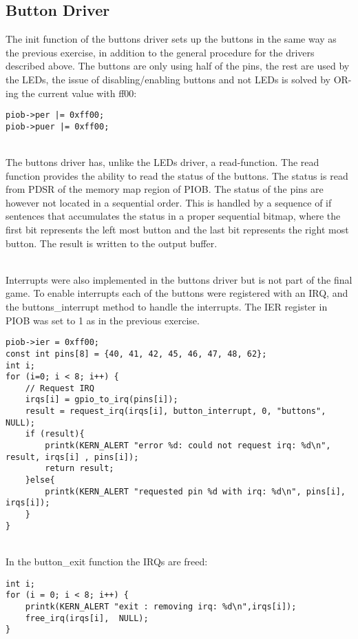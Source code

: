 \subsection{Button Driver}
The init function of the buttons driver sets up the buttons in the same way as the previous exercise, in addition to the general procedure for the drivers described above. The buttons are only using half of the pins, the rest are used by the LEDs, the issue of disabling/enabling buttons and not LEDs is solved by OR-ing the current value with ff00:
\begin{lstlisting}
piob->per |= 0xff00;
piob->puer |= 0xff00;
\end{lstlisting}

\\The buttons driver has, unlike the LEDs driver, a read-function. The read function provides the ability to read the status of the buttons. The status is read from PDSR of the memory map region of PIOB. The status of the pins are however not located in a sequential order. This is handled by a sequence of if sentences that accumulates the status in a proper sequential bitmap, where the first bit represents the left most button and the last bit represents the right most button. The result is written to the output buffer.

\\Interrupts were also implemented in the buttons driver but is not part of the final game. To enable interrupts each of the buttons were registered with an IRQ, and the buttons_interrupt method to handle the interrupts. The IER register in PIOB was set to 1 as in the previous exercise.
\begin{lstlisting}
piob->ier = 0xff00;
const int pins[8] = {40, 41, 42, 45, 46, 47, 48, 62};
int i;
for (i=0; i < 8; i++) {
	// Request IRQ
	irqs[i] = gpio_to_irq(pins[i]);
	result = request_irq(irqs[i], button_interrupt, 0, "buttons", NULL);
	if (result){
		printk(KERN_ALERT "error %d: could not request irq: %d\n", result, irqs[i] , pins[i]);
		return result;
	}else{
		printk(KERN_ALERT "requested pin %d with irq: %d\n", pins[i], irqs[i]);
	}
}
\end{lstlisting}

\\In the button_exit function the IRQs are freed:
\begin{lstlisting}
int i;
for (i = 0; i < 8; i++) {
	printk(KERN_ALERT "exit : removing irq: %d\n",irqs[i]);
	free_irq(irqs[i],  NULL);
}
\end{lstlisting}

